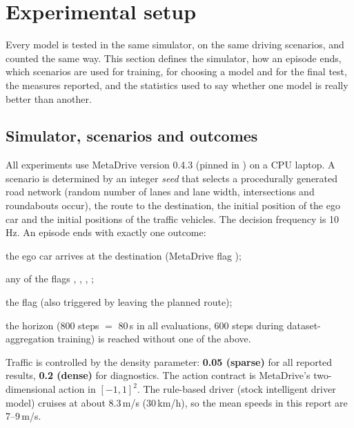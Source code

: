 \section{Experimental setup}\label{sec:setup}

\begin{plainwords}
Every model is tested in the same simulator, on the same driving scenarios, and counted the same way. This section defines the simulator, how an episode ends, which scenarios are used for training, for choosing a model and for the final test, the measures reported, and the statistics used to say whether one model is really better than another.
\end{plainwords}


\subsection{Simulator, scenarios and outcomes}
All experiments use MetaDrive version 0.4.3 (pinned in ) on a CPU laptop. A scenario is determined by an integer \emph{seed} that selects a procedurally generated road network (random number of lanes and
lane width, intersections and roundabouts occur), the route to the destination, the initial position of the ego car and the initial positions of the traffic vehicles. The decision frequency is 10\,Hz. An episode ends with exactly one outcome:
\begin{description}[leftmargin=3.2cm,style=nextline]
\item[success] the ego car arrives at the destination (MetaDrive flag );
\item[collision] any of the flags , , , ;
\item[left the road] the flag  (also triggered by leaving the planned route);
\item[timeout] the horizon (800 steps $=$ 80\,s in all evaluations, 600 steps during dataset-aggregation training) is reached without one of the above.
\end{description}
Traffic is controlled by the density parameter: \textbf{0.05 (sparse)} for all reported results, \textbf{0.2 (dense)} for diagnostics. The action contract is MetaDrive's two-dimensional action
 in $[-1,1]^2$. The rule-based driver (stock intelligent driver model) cruises at about 8.3\,m/s (30\,km/h), so the mean speeds in this report are 7--9\,m/s.

